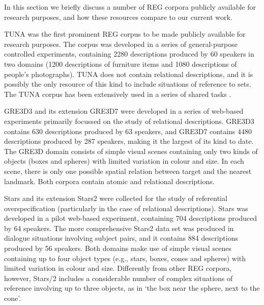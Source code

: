 \documentclass{article}
\begin{document}
In this section we briefly discuss a number of REG corpora publicly available for research purposes, and how these resources compare to our current work.

TUNA \cite{tuna-corpus} was the first prominent REG corpus to be made publicly available for research purposes. The corpus was developed in a series of general-purpose controlled experiments, containing 2280 descriptions produced by 60 speakers in two domains (1200 descriptions of furniture items and 1080 descriptions of people's photographs). TUNA does not contain relational descriptions, and it is possibly the only resource of this kind to include situations of reference to sets. The TUNA corpus has been extensively used in a series of shared tasks \cite{reg2009}.

GRE3D3 and its extension GRE3D7 \cite{gre3d3,gre3d7} were developed in a series of web-based experiments primarily focussed on the study of relational descriptions. GRE3D3 contains 630 descriptions produced by 63 speakers, and GRE3D7 contains 4480 descriptions produced by 287 speakers, making it the largest of its kind to date. The GRE3D domain consists of simple visual scenes containing only two kinds of objects (boxes and spheres) with limited variation in colour and size. In each scene, there is only one possible spatial relation between target and the nearest landmark. Both corpora contain atomic and relational descriptions.

Stars \cite{stars-mutual-disamb} and its extension Stars2 were collected for the study of referential overspecification (particularly in the case of relational descriptions). Stars was developed in a pilot web-based experiment, containing 704 descriptions produced by 64 speakers.  The more comprehensive Stars2 data set was produced in dialogue situations involving subject pairs, and it contains 884 descriptions produced by 56 speakers. Both domains make use of simple visual scenes containing up to four object types (e.g., stars, boxes, cones and spheres) with limited variation in colour and size. Differently from other REG corpora, however, Stars/2 includes a considerable number of complex situations of reference involving up to three objects, as in `the box near the sphere, next to the cone'. 
\end{document}
